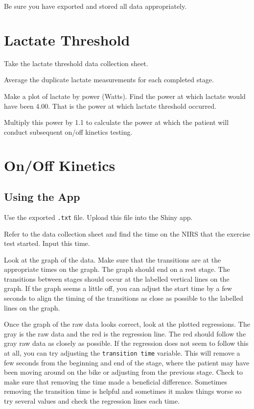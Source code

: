\documentclass[
]{book}
\begin{document}
Be sure you have exported and stored all data appropriately.

\hypertarget{DataAnalysis-LT}{%
\section{Lactate Threshold}\label{DataAnalysis-LT}}

Take the lactate threshold data collection sheet.

Average the duplicate lactate measurements for each completed stage.

Make a plot of lactate by power (Watts). Find the power at which lactate would have been 4.00. That is the power at which lactate threshold occurred.

Multiply this power by 1.1 to calculate the power at which the patient will conduct subsequent on/off kinetics testing.

\hypertarget{DataAnalysis-Onoff}{%
\section{On/Off Kinetics}\label{DataAnalysis-Onoff}}

\hypertarget{using-the-app}{%
\subsection{Using the App}\label{using-the-app}}

Use the exported \texttt{.txt} file. Upload this file into the Shiny app.

Refer to the data collection sheet and find the time on the NIRS that the exercise test started. Input this time.

Look at the graph of the data. Make sure that the transitions are at the appropriate times on the graph. The graph should end on a rest stage. The transitions between stages should occur at the labelled vertical lines on the graph. If the graph seems a little off, you can adjust the start time by a few seconds to align the timing of the transitions as close as possible to the labelled lines on the graph.

Once the graph of the raw data looks correct, look at the plotted regressions. The gray is the raw data and the red is the regression line. The red should follow the gray raw data as closely as possible. If the regression does not seem to follow this at all, you can try adjusting the \texttt{transition\ time} variable. This will remove a few seconds from the beginning and end of the stage, where the patient may have been moving around on the bike or adjusting from the previous stage. Check to make sure that removing the time made a beneficial difference. Sometimes removing the transition time is helpful and sometimes it makes things worse so try several values and check the regression lines each time.
\end{document}
